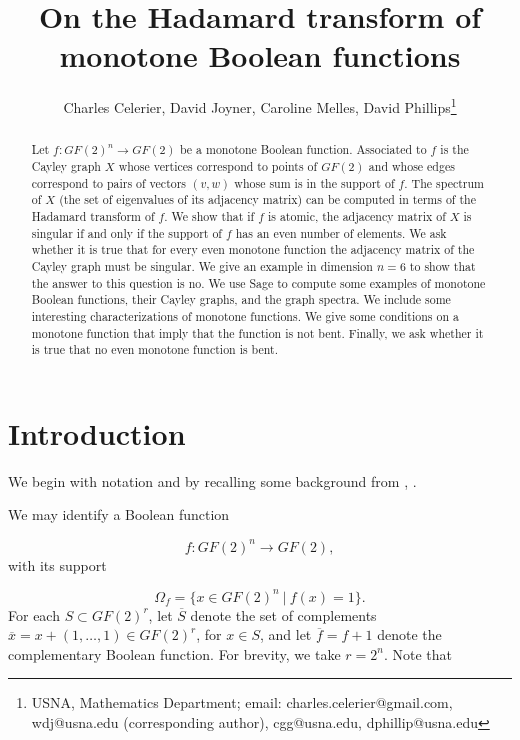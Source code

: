 \documentclass[12pt]{article}
\begin{document}
\author{Charles Celerier, David Joyner, Caroline Melles, David
  Phillips\thanks{USNA, Mathematics Department;
email: charles.celerier@gmail.com, wdj@usna.edu (corresponding author),
cgg@usna.edu, dphillip@usna.edu}}

\title{On the Hadamard transform of monotone Boolean functions}

\maketitle

\begin{abstract}
  Let $f:GF(2)^n \rightarrow GF(2)$ be a monotone Boolean function.  Associated to
  $f$ is the Cayley graph $X$ whose vertices correspond to points of $GF(2)$
  and whose edges correspond to pairs of vectors $(v,w)$ whose sum is in
  the support of $f$.  The spectrum of $X$ (the set of eigenvalues of its
  adjacency matrix) can be computed in terms of the Hadamard transform
  of $f$.  We show that if $f$ is atomic, the adjacency matrix of $X$ is
  singular if and only if the support of $f$ has an even number of
  elements.  We ask whether it is true that for every even monotone
  function the adjacency matrix of the Cayley graph must be singular.
  We give an example in dimension $n=6$ to show that the answer to this
  question is no.  We use Sage to compute some examples of monotone
  Boolean functions, their Cayley graphs, and the graph spectra.  We
  include some interesting characterizations of monotone functions.
  We give some conditions on a monotone function that imply that the
  function is not bent.  Finally, we ask whether it is true that no
  even monotone function is bent.
\end{abstract}

\section{Introduction}

We begin with notation and by recalling some background
from \cite{art:s07}, \cite{art:bc99}.

We may identify a Boolean function

\[
f:GF(2)^n\to GF(2),
\]
with its support

\[
\Omega_f = \{x\in GF(2)^n\ |\ f(x)=1\}.
\]
For each $S\subset GF(2)^r$, let $\overline{S}$ denote the
set of complements $\overline{x}=x+(1,\dots,1)\in GF(2)^r$,
for $x\in S$, and let $\overline{f}=f+1$ denote the complementary
Boolean function. For brevity, we take $r=2^n$. Note that
\end{document}
